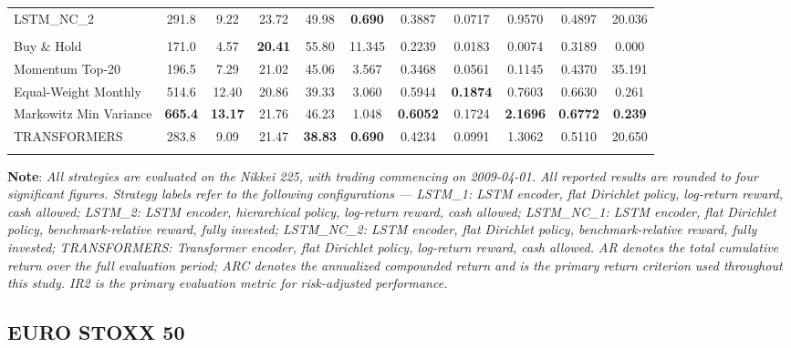\documentclass[]{elsarticle}
\begin{document}
\begin{table}[htbp]
{\begin{tabular}{lcccccccccc}
LSTM\_NC\_2 & 291.8 & 9.22 & 23.72 & 49.98 & \textbf{0.690} & 0.3887 & 0.0717 & 0.9570 & 0.4897 & 20.036 \\
\addlinespace
\multicolumn{11}{l}{\textbf{Panel C: RL with Transformers}} \\
\midrule
Buy \& Hold & 171.0 & 4.57 & \textbf{20.41} & 55.80 & 11.345 & 0.2239 & 0.0183 & 0.0074 & 0.3189 & 0.000 \\
Momentum Top-20 & 196.5 & 7.29 & 21.02 & 45.06 & 3.567 & 0.3468 & 0.0561 & 0.1145 & 0.4370 & 35.191 \\
Equal-Weight Monthly & 514.6 & 12.40 & 20.86 & 39.33 & 3.060 & 0.5944 & \textbf{0.1874} & 0.7603 & 0.6630 & 0.261 \\
Markowitz Min Variance & \textbf{665.4} & \textbf{13.17} & 21.76 & 46.23 & 1.048 & \textbf{0.6052} & 0.1724 & \textbf{2.1696} & \textbf{0.6772} & \textbf{0.239} \\
TRANSFORMERS & 283.8 & 9.09 & 21.47 & \textbf{38.83} & \textbf{0.690} & 0.4234 & 0.0991 & 1.3062 & 0.5110 & 20.650 \\
\addlinespace
\bottomrule
\end{tabular}%
}
\end{table}

\vspace{-0.4cm}
\noindent\linespread{0.61}\selectfont
{\scriptsize \textbf{Note}: \textit{All strategies are evaluated on the Nikkei 225, with trading commencing on 2009-04-01. All reported results are rounded to four significant figures. Strategy labels refer to the following configurations --- LSTM\_1: LSTM encoder, flat Dirichlet policy, log-return reward, cash allowed; LSTM\_2: LSTM encoder, hierarchical policy, log-return reward, cash allowed; LSTM\_NC\_1: LSTM encoder, flat Dirichlet policy, benchmark-relative reward, fully invested; LSTM\_NC\_2: LSTM encoder, flat Dirichlet policy, benchmark-relative reward, fully invested; TRANSFORMERS: Transformer encoder, flat Dirichlet policy, log-return reward, cash allowed. AR denotes the total cumulative return over the full evaluation period; ARC denotes the annualized compounded return and is the primary return criterion used throughout this study. IR2 is the primary evaluation metric for risk-adjusted performance.}}

\linespread{1.5}\selectfont

\hypertarget{er_EUSTXX}{%
\subsection{EURO STOXX 50}\label{er_EUSTXX}}
\end{document}
